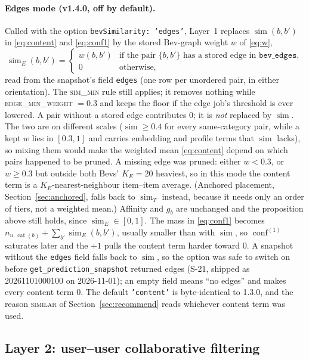 \documentclass[11pt]{article}
\DeclareMathOperator{\simi}{sim}
\DeclareMathOperator{\conf}{conf}
\DeclareMathOperator{\cat}{cat}
\newcommand{\code}[1]{\texttt{#1}}
\theoremstyle{plain}
\theoremstyle{definition}
\theoremstyle{remark}
\begin{document}
\paragraph{Edges mode (v1.4.0, off by default).} Called with the option \code{bevSimilarity: 'edges'}, Layer~1 replaces $\simi(b, b')$ in \eqref{eq:content} and \eqref{eq:conf1} by the stored Bev-graph weight $w$ of \eqref{eq:w},
\begin{equation}\label{eq:simE}
\simi_E(b, b') = \begin{cases} w(b, b') & \text{if the pair } \{b, b'\} \text{ has a stored edge in } \code{bev\_edges},\\ 0 & \text{otherwise,} \end{cases}
\end{equation}
read from the snapshot's field \code{edges} (one row per unordered pair, in either orientation). The \textsc{sim\_min} rule still applies; it removes nothing while \textsc{edge\_min\_weight} $= 0.3$ and keeps the floor if the edge job's threshold is ever lowered. A pair without a stored edge contributes $0$; it is \emph{not} replaced by $\simi$. The two are on different scales ($\simi \ge 0.4$ for every same-category pair, while a kept $w$ lies in $[0.3, 1]$ and carries embedding and profile terms that $\simi$ lacks), so mixing them would make the weighted mean \eqref{eq:content} depend on which pairs happened to be pruned. A missing edge was pruned: either $w < 0.3$, or $w \ge 0.3$ but outside both Bevs' $K_E = 20$ heaviest, so in this mode the content term is a $K_E$-nearest-neighbour item--item average. (Anchored placement, Section~\ref{sec:anchored}, falls back to $\simi_T$ instead, because it needs only an order of tiers, not a weighted mean.) Affinity and $g_b$ are unchanged and the proposition above still holds, since $\simi_E \in [0, 1]$. The mass in \eqref{eq:conf1} becomes $n_{u,\cat(b)} + \sum_{b'} \simi_E(b, b')$, usually smaller than with $\simi$, so $\conf^{(1)}$ saturates later and the $+1$ pulls the content term harder toward $0$. A snapshot without the \code{edges} field falls back to $\simi$, so the option was safe to switch on before \code{get\_prediction\_snapshot} returned edges (S-21, shipped as 20261101000100 on 2026-11-01); an empty field means ``no edges'' and makes every content term $0$. The default \code{'content'} is byte-identical to 1.3.0, and the reason \textsc{similar} of Section~\ref{sec:recommend} reads whichever content term was used.

\subsection{Layer 2: user--user collaborative filtering}
\end{document}

